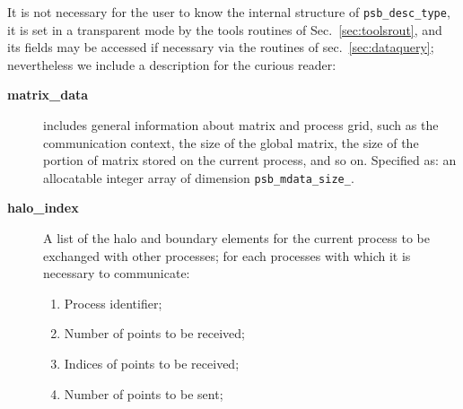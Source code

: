 It is not necessary for the user to know the internal structure of
\verb|psb_desc_type|, it is set in a transparent mode by the tools
routines of Sec.~\ref{sec:toolsrout}, and its fields may be accessed
if necessary via  the routines of sec.~\ref{sec:dataquery};
nevertheless we include a  description for the curious 
reader:   
\begin{description}
\item[{\bf matrix\_data}] includes general information about matrix and
process grid, such as the communication context, the size of the
global matrix, the size of the portion of matrix stored on the current
process, and so on. %
Specified as: an allocatable integer array of dimension \verb|psb_mdata_size_|.
\item[{\bf halo\_index}] A list of the halo and boundary elements for
the current process to be exchanged with other processes; for each
processes with which it is necessary to communicate:
\begin{enumerate}
\item Process identifier;
\item Number of points to be received;
\item Indices of points to be received;
\item Number of points to be sent;

\end{enumerate}
\end{description}
